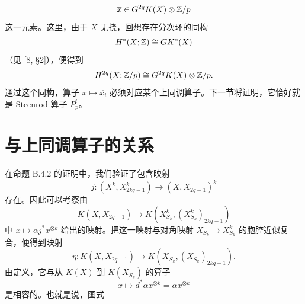 \[
  \overline{x}\in G^{2q}K(X)\otimes\mathbb{Z}/p
\]
这一元素。这里，由于 $X$ 无挠，回想存在分次环的同构
\[
  H^*(X;\mathbb{Z})\cong GK^*(X)
\]
（见 [8, §2]），便得到
\[
  H^{2q}(X;\mathbb{Z}/p)\cong G^{2q}K(X)\otimes\mathbb{Z}/p.
\]
通过这个同构，算子 $x\mapsto\overline{x_i}$ 必须对应某个上同调算子。下一节将证明，它恰好就是 Steenrod 算子 $P^i_p$。


\section{与上同调算子的关系}

在命题 B.4.2 的证明中，我们验证了包含映射
\[
  j\colon(X^k,X^k_{2kq-1})\to(X,X_{2q-1})^k
\]
存在。因此可以考察由
\[
  K(X,X_{2q-1})\to K(X^k_{S_k},(X^k_{S_k})_{2kq-1})
\]
中 $x\mapsto\alpha j^*x^{\otimes k}$ 给出的映射。把这一映射与对角映射 $X_{S_k}\to X^k_{S_k}$ 的胞腔近似复合，便得到映射
\[
  \eta\colon K(X,X_{2q-1})\to K(X_{S_k},(X_{S_k})_{2kq-1}).
\]
由定义，它与从 $K(X)$ 到 $K(X_{S_k})$ 的算子
\[
  x\mapsto d^*\alpha x^{\otimes k}=\alpha x^{\otimes k}
\]
是相容的。也就是说，图式

